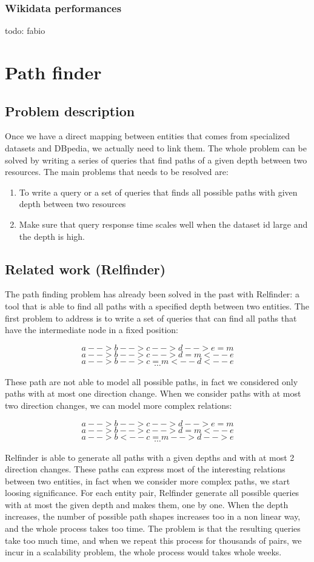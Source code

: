 \documentclass[paper=a4, fontsize=11pt]{scrartcl}
\begin{document}
\subsubsection{Wikidata performances}
todo: fabio

\section{Path finder}
\subsection{Problem description}
Once we have a direct mapping between entities that comes from specialized datasets and DBpedia, we actually need to link them.
The whole problem can be solved by writing a series of queries that find paths of a given depth between two resources. 
The main problems that needs to be resolved are:
\begin{enumerate}
\item To write a query or a set of queries that finds all possible paths with given depth between two resources
\item Make sure that query response time scales well when the dataset id large and the depth is high.
\end{enumerate}

\subsection{Related work (Relfinder)}
The path finding problem has already been solved in the past with Relfinder: a tool that is able to find all paths with a specified depth between two entities. 
The first problem to address is to write a set of queries that can find all paths that have the intermediate node in a fixed position:

$$a-->b-->c-->d-->e=m$$
$$a-->b-->c-->d=m<--e$$
$$a-->b-->c=m<--d<--e$$
$$\cdots$$

These path are not able to model all possible paths, in fact we considered only paths with at most one direction change.
When we consider paths with at most two direction changes, we can model more complex relations:

$$a-->b-->c-->d-->e=m$$
$$a-->b-->c-->d=m<--e$$
$$a-->b<--c=m-->d-->e$$
$$\cdots$$

Relfinder is able to generate all paths with a given depths and with at most 2 direction changes.
These paths can express most of the interesting relations between two entities, in fact when we consider more complex paths, we start loosing significance.
For each entity pair, Relfinder generate all possible queries with at most the given depth and makes them, one by one.
When the depth increases, the number of possible path shapes increases too in a non linear way, and the whole process takes too time. The problem is that the resulting queries take too much time, and when we repeat this process for thousands of pairs, we incur in a scalability problem, the whole process would takes whole weeks.
\end{document}
